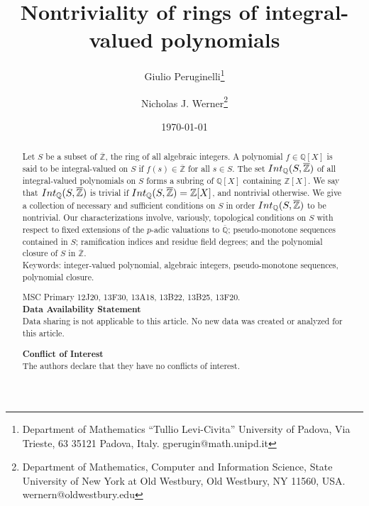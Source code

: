 \documentclass{article}
\title{Nontriviality of rings of integral-valued polynomials}
\author{Giulio Peruginelli\footnote{Department of Mathematics ``Tullio Levi-Civita'' University of Padova, Via Trieste, 63 35121 Padova, Italy. gperugin@math.unipd.it}
\and
Nicholas J. Werner\footnote{Department of Mathematics, Computer and Information Science, State University of New York at Old Westbury, Old Westbury, NY 11560, USA. wernern@oldwestbury.edu}}
\date{\today}
\theoremstyle{definition}\newtheorem{Def}[equation]{Definition}
\theoremstyle{definition}\newtheorem{Ques}[equation]{Question}
\theoremstyle{definition}\newtheorem{Conj}[equation]{Conjecture}
\theoremstyle{definition}\newtheorem{Not}[equation]{Notation}
\newcommand{\Q}{\mathbb{Q}}
\newcommand{\oQ}{\overline{\Q}}
\newcommand{\oZ}{\overline{\Z}}
\newcommand{\Z}{\mathbb{Z}}
\newcommand{\Int}{\textnormal{Int}}
\newcommand{\IntQ}{\Int_{\Q}}
\numberwithin{equation}{section}
\begin{document}
{}
{\let\newpage\relax\maketitle} 


\begin{abstract}

\noindent Let $S$ be a subset of $\oZ$, the ring of all algebraic integers. A polynomial $f \in \Q[X]$ is said to be integral-valued on $S$ if $f(s) \in \oZ$ for all $s \in S$. The set $\IntQ(S,\oZ)$ of all integral-valued polynomials on $S$ forms a subring of $\Q[X]$ containing $\Z[X]$. We say that $\IntQ(S,\oZ)$ is trivial if $\IntQ(S,\oZ) = \Z[X]$, and nontrivial otherwise. We give a collection of necessary and sufficient conditions on $S$ in order $\IntQ(S,\oZ)$ to be nontrivial. Our characterizations involve, variously, topological conditions on $S$ with respect to fixed extensions of the $p$-adic valuations to $\oQ$; pseudo-monotone sequences contained in $S$; ramification indices and residue field degrees; and the polynomial closure of $S$ in $\oZ$.\\

\noindent Keywords: integer-valued polynomial, algebraic integers, pseudo-monotone sequences, polynomial closure.

\noindent MSC Primary 12J20, 13F30, 13A18, 13B22, 13B25, 13F20.\\

\noindent\textbf{Data Availability Statement}\\
Data sharing is not applicable to this article. No new data was created or analyzed for this article.

\noindent\textbf{Conflict of Interest}\\
The authors declare that they have no conflicts of interest.
   \end{abstract}
\end{document}
